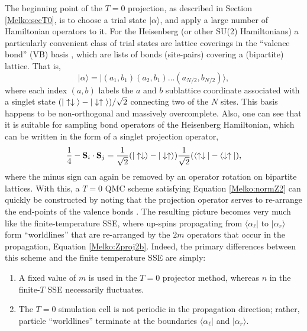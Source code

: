 \documentclass[vecphys]{svmult}
\begin{document}
The beginning point of the $T=0$ projection, as described in Section \ref{Melko:secT0}, is to choose a trial state $| \alpha \rangle$, and apply a large number of Hamiltonian operators to it.  
For the Heisenberg (or other SU(2) Hamiltonians) a particularly convenient class of trial states are lattice coverings in the ``valence bond'' (VB) basis \cite{Melko:Liang88,Melko:Sandvik05,Melko:Beach06,Melko:AWSBeach}, which are lists of bonds (site-pairs) covering a (bipartite) lattice.  That is, 
\begin{equation}
| \alpha \rangle = | (a_1,b_1)(a_2,b_1) \ldots (a_{N/2}, b_{N/2})  \rangle,
\end{equation}
where each index $(a,b)$ labels the $a$ and $b$ sublattice coordinate associated with a singlet state $(|\uparrow \downarrow \hspace{1mm} \rangle  - | \downarrow \uparrow \hspace{1mm} \rangle)/\sqrt{2}$ connecting two of the $N$ sites.  This basis happens to be non-orthogonal and massively overcomplete.  Also, one can see that it is suitable for sampling bond operators of the Heisenberg Hamiltonian, which can be written in the form of a singlet projection operator,
\begin{equation}
\frac{1}{4} - {\bf  S}_i \cdot {\bf S}_j = \frac{1}{\sqrt{2}} (|\uparrow \downarrow \rangle  - |\downarrow \uparrow \rangle)
 \frac{1}{\sqrt{2}}  (\langle \uparrow \downarrow |  - \langle \downarrow \uparrow |),
\end{equation}
where the minus sign can again be removed by an operator rotation on bipartite lattices.
With this, a $T=0$ QMC scheme satisfying Equation \ref{Melko:normZ2} can quickly be constructed by noting that the projection operator serves to re-arrange the end-points of the valence bonds \cite{Melko:Sandvik05}.  The resulting picture becomes very much like the finite-temperature SSE, where up-spins propagating from $\langle \alpha_{\ell} |$ to $| \alpha_r \rangle$ form ``worldlines'' that are re-arranged by the $2m$ operators that occur in the propagation, Equation \ref{Melko:Zproj2b}.
Indeed, the primary differences between this scheme and the finite temperature SSE are simply:
\begin{enumerate}
\item A fixed value of $m$ is used in the $T=0$ projector method, whereas $n$ in the finite-$T$ SSE necessarily fluctuates.
\item The $T=0$ simulation cell is not periodic in the propagation direction; rather, particle ``worldlines'' terminate at the boundaries  $\langle \alpha_{\ell} |$ and $| \alpha_r \rangle$.
\end{enumerate}
\end{document}
